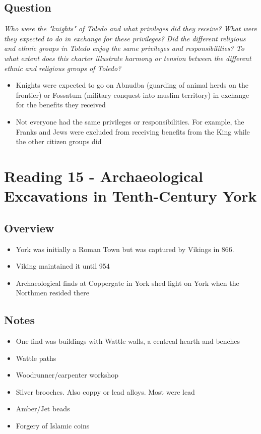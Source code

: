 \documentclass[12pt]{article}
\begin{document}
\subsection*{Question}

\textit{Who were the "knights" of Toledo and what privileges did they receive? What were they expected to do in exchange for these privileges? Did the different religious and ethnic groups in Toledo enjoy the same privileges and responsibilities? To what extent does this charter illustrate harmony or tension between the different ethnic and religious groups of Toledo?}

\begin{itemize}
	\item Knights were expected to go on Abnudba (guarding of animal herds on the frontier) or Fossatum (military conquest into muslim territory) in exchange for the benefits they received
	\item Not everyone had the same privileges or responsibilities. For example, the Franks and Jews were excluded from receiving benefits from the King while the other citizen groups did
\end{itemize}


\section*{Reading 15 - Archaeological Excavations in Tenth-Century York}

\subsection*{Overview}
\begin{itemize}
	\item York was initially a Roman Town but was captured by Vikings in 866.
	\item Viking maintained it until 954
	\item Archaeological finds at Coppergate in York shed light on York when the Northmen resided there
\end{itemize}

\subsection*{Notes}
\begin{itemize}
	\item One find was buildings with Wattle walls, a centreal hearth and benches
	\item Wattle paths
	\item Woodrunner/carpenter workshop
	\item Silver brooches. Also coppy or lead alloys. Most were lead
	\item Amber/Jet beads
	\item Forgery of Islamic coins
\end{itemize}
\end{document}

